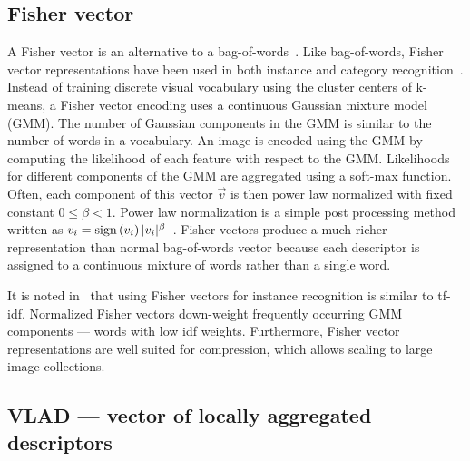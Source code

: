     \subsection{Fisher vector}
        A Fisher vector is an alternative to a bag-of-words~\cite{perronnin_large_scale_2010_1,
        jegou_aggregating_2010}. Like bag-of-words, Fisher vector representations have been used in both instance
        and category recognition~\cite{perronnin_fisher_2007, cinbis_image_2012, sun_large_scale_2013,
        sanchez_image_2013, juneja_blocks_2013, douze_combining_2011, ma_local_2012, murray_generalized_2014,
        gosselin_revisiting_2014}. Instead of training discrete visual vocabulary using the cluster centers of
        k-means, a Fisher vector encoding uses a continuous Gaussian mixture model (GMM). The number of Gaussian
        components in the GMM is  similar to the number of words in a vocabulary. An image is encoded using the GMM
        by computing the likelihood of each feature with respect to the GMM{}. Likelihoods for different components
        of the GMM are aggregated using a soft-max function. Often, each component of this vector $\vec{v}$ is then
        power law normalized with fixed constant $0 \leq \beta < 1$. Power law normalization is a simple post
        processing method written as $v_i = \textrm{sign}\left(v_i\right)|v_i|^\beta$~\cite{jegou_aggregating_2012}.
        Fisher vectors produce a much richer representation than normal bag-of-words vector because each descriptor
        is assigned to a continuous mixture of words rather than a single word.

        It is noted in~\cite{perronnin_large_scale_2010_1} that using Fisher vectors for instance recognition is
        similar to tf-idf. Normalized Fisher vectors down-weight frequently occurring GMM components --- \ie{}
        words with low idf weights. Furthermore, Fisher vector representations are well suited for compression,
        which allows scaling to large image collections.

    \subsection{VLAD --- vector of locally aggregated descriptors} 

